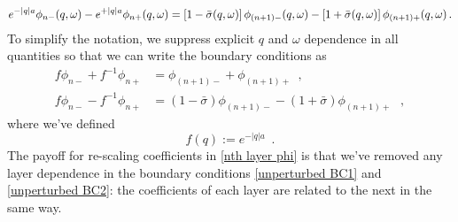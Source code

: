 \documentclass{article}
\begin{document}
\begin{equation}
    \label{superlattice discont init expression}
    e^{-|q|a} \phi_{n-}(q,\omega) - e^{+|q|a}\phi_{n+}(q,\omega) = 
   \left[1-\bar\sigma(q,\omega)\right] \phi_{(n+1)-}(q,\omega)-\left[1+\bar\sigma(q,\omega)\right] \phi_{(n+1)+}(q,\omega)
   \,.
\end{equation}
To simplify the notation, we suppress explicit $q$ and $\omega$ dependence in all quantities so that we can write the boundary conditions as
\begin{align}
    \label{unperturbed BC1}
    f \phi_{n-} + f^{-1}\phi_{n+} &= \phi_{(n+1)-} + \phi_{(n+1)+}
    \,\,\,,
    \\
    \label{unperturbed BC2}
    f \phi_{n-} - f^{-1}\phi_{n+} &= (1-\bar\sigma)\phi_{(n+1)-}-(1+\bar\sigma)\phi_{(n+1)+}
    \,\,\,\,,
\end{align}
where we've defined
\begin{equation}
    \label{f def}
    f(q):=e^{-|q|a}
    \,\,\,.
\end{equation}
The payoff for re-scaling coefficients in \eqref{nth layer phi} is that we've  removed any layer dependence in the boundary conditions \eqref{unperturbed BC1} and \eqref{unperturbed BC2}: the coefficients of each layer are related to the next in the same way.
\end{document}
